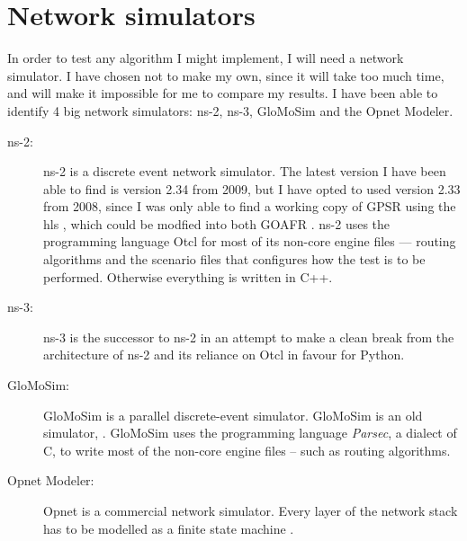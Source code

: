 \section{Network simulators}
\label{section:network_simulators}

In order to test any algorithm I might implement, I will need a network simulator. I have chosen not to make my own, since it will take too much time, and will make it impossible for me to compare my results. I have been able to identify 4 big network simulators: ns-2, ns-3, GloMoSim and the Opnet Modeler.

\begin{description}
\item[ns-2:] ns-2 is a discrete event network simulator. The latest version I have been able to find is version 2.34 from 2009, but I have opted to used version 2.33 from 2008, since I was only able to find a working copy of GPSR  using the \ac{hls} , which could be modfied into both GOAFR . ns-2 uses the programming language Otcl for most of its non-core engine files ---  routing algorithms and the scenario files that configures how the test is to be performed. Otherwise everything is written in C++.
\item[ns-3:] ns-3 is the successor to ns-2 in an attempt to make a clean break from the architecture of ns-2 and its reliance on Otcl in favour for Python.
\item[GloMoSim:] GloMoSim is a parallel discrete-event simulator. GloMoSim is an old simulator, . GloMoSim uses the programming language \emph{Parsec}, a dialect of C, to write most of the non-core engine files -- such as routing algorithms. 
\item[Opnet Modeler:] Opnet is a commercial network simulator. Every layer of the network stack has to be modelled as a finite state machine \cite{MANcom}. 
\end{description}

